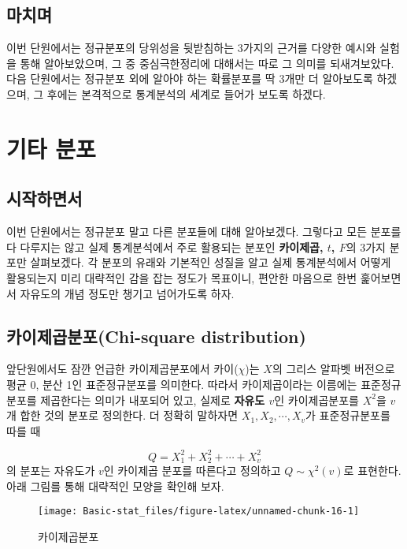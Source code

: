 \documentclass[]{book}
\begin{document}
\section{마치며}\label{uxb9c8uxce58uxba70-1}

이번 단원에서는 정규분포의 당위성을 뒷받침하는 3가지의 근거를 다양한
예시와 실험을 통해 알아보았으며, 그 중 중심극한정리에 대해서는 따로 그
의미를 되새겨보았다. 다음 단원에서는 정규분포 외에 알아야 하는
확률분포를 딱 3개만 더 알아보도록 하겠으며, 그 후에는 본격적으로
통계분석의 세계로 들어가 보도록 하겠다.

\chapter{기타 분포}\label{uxae30uxd0c0-uxbd84uxd3ec}

\section{시작하면서}\label{uxc2dcuxc791uxd558uxba74uxc11c-2}

이번 단원에서는 정규분포 말고 다른 분포들에 대해 알아보겠다. 그렇다고
모든 분포를 다 다루지는 않고 실제 통계분석에서 주로 활용되는 분포인
\textbf{카이제곱, \(t\), \(F\)}의 3가지 분포만 살펴보겠다. 각 분포의
유래와 기본적인 성질을 알고 실제 통계분석에서 어떻게 활용되는지 미리
대략적인 감을 잡는 정도가 목표이니, 편안한 마음으로 한번 훑어보면서
자유도의 개념 정도만 챙기고 넘어가도록 하자.

\section{카이제곱분포(Chi-square
distribution)}\label{uxce74uxc774uxc81cuxacf1uxbd84uxd3ecchi-square-distribution-1}

앞단원에서도 잠깐 언급한 카이제곱분포에서 카이(\(\chi\))는 \(X\)의
그리스 알파벳 버전으로 평균 0, 분산 1인 표준정규분포를 의미한다. 따라서
카이제곱이라는 이름에는 표준정규분포를 제곱한다는 의미가 내포되어 있고,
실제로 \textbf{자유도 \(v\)}인 카이제곱분포를 \(X^2\)을 \(v\)개 합한
것의 분포로 정의한다. 더 정확히 말하자면 \(X_1, X_2,\cdots, X_v\)가
표준정규분포를 따를 때

\[Q = X_1^2+X_2^2+\cdots+X_v^2\] 의 분포는 자유도가 \(v\)인 카이제곱
분포를 따른다고 정의하고 \(Q\sim\chi^2(v)\)로 표현한다. 아래 그림를 통해
대략적인 모양을 확인해 보자.

\begin{figure}

{\centering \texttt{[image: Basic-stat\_files/figure-latex/unnamed-chunk-16-1]} 

}

\caption{카이제곱분포}\label{fig:unnamed-chunk-16}
\end{figure}
\end{document}
